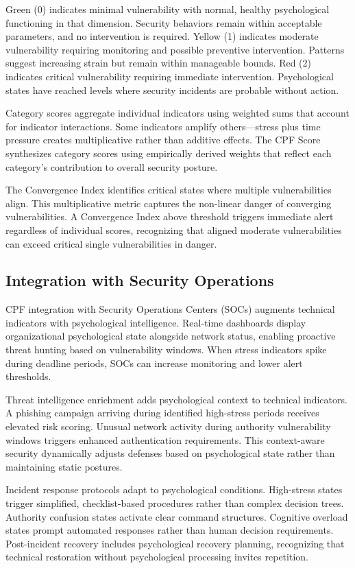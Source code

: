 \documentclass[manuscript,screen,review]{acmart}
\begin{document}
Green (0) indicates minimal vulnerability with normal, healthy psychological functioning in that dimension. Security behaviors remain within acceptable parameters, and no intervention is required. Yellow (1) indicates moderate vulnerability requiring monitoring and possible preventive intervention. Patterns suggest increasing strain but remain within manageable bounds. Red (2) indicates critical vulnerability requiring immediate intervention. Psychological states have reached levels where security incidents are probable without action.

Category scores aggregate individual indicators using weighted sums that account for indicator interactions. Some indicators amplify others—stress plus time pressure creates multiplicative rather than additive effects. The CPF Score synthesizes category scores using empirically derived weights that reflect each category's contribution to overall security posture.

The Convergence Index identifies critical states where multiple vulnerabilities align. This multiplicative metric captures the non-linear danger of converging vulnerabilities. A Convergence Index above threshold triggers immediate alert regardless of individual scores, recognizing that aligned moderate vulnerabilities can exceed critical single vulnerabilities in danger.

\subsection{Integration with Security Operations}

CPF integration with Security Operations Centers (SOCs) augments technical indicators with psychological intelligence. Real-time dashboards display organizational psychological state alongside network status, enabling proactive threat hunting based on vulnerability windows. When stress indicators spike during deadline periods, SOCs can increase monitoring and lower alert thresholds.

Threat intelligence enrichment adds psychological context to technical indicators. A phishing campaign arriving during identified high-stress periods receives elevated risk scoring. Unusual network activity during authority vulnerability windows triggers enhanced authentication requirements. This context-aware security dynamically adjusts defenses based on psychological state rather than maintaining static postures.

Incident response protocols adapt to psychological conditions. High-stress states trigger simplified, checklist-based procedures rather than complex decision trees. Authority confusion states activate clear command structures. Cognitive overload states prompt automated responses rather than human decision requirements. Post-incident recovery includes psychological recovery planning, recognizing that technical restoration without psychological processing invites repetition.
\end{document}

